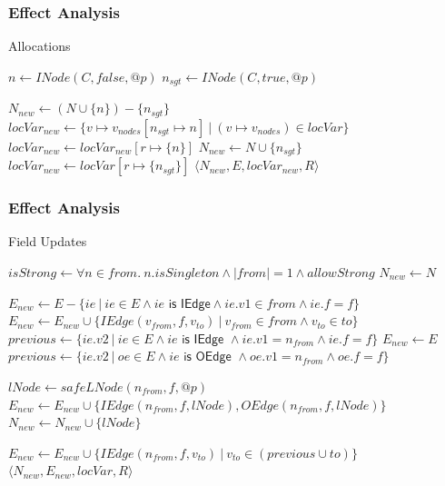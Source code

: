 \documentclass[hyperref={pdfpagelabels=false}]{beamer}
\begin{document}
\begin{frame}[fragile,shrink=20]
    \frametitle{Effect Analysis}
    \begin{algorithm}[H]
    \caption{Allocations}\label{algo:pt:alloc}
    \begin{algorithmic}[1]
        \State $n       \gets INode(C, false, @p)$
        \State $n_{sgt} \gets INode(C, true, @p)$

            \State $N_{new} \gets (N \cup \{ n \}) - \{ n_{sgt} \}$
            \State $locVar_{new} \gets \{ v \mapsto v_{nodes}[n_{sgt} \mapsto n] ~|~ (v \mapsto v_{nodes}) \in locVar \}$
            \State $locVar_{new} \gets locVar_{new}[ r \mapsto \{n\}]$
        \Else
            \State $N_{new} \gets N \cup \{ n_{sgt} \}$
            \State $locVar_{new} \gets locVar[ r \mapsto \{n_{sgt}\}]$
        \EndIf
        \State \Return $\langle N_{new}, E, locVar_{new}, R \rangle$
    \EndFunction
    \end{algorithmic}
    \end{algorithm}
\end{frame}

\begin{frame}[fragile,shrink=40]
    \frametitle{Effect Analysis}

    \begin{algorithm}[H]
    \caption{Field Updates}\label{algo:pt:writes}
    \begin{algorithmic}[1]
        \State $isStrong \gets \forall n \in from.~ n.isSingleton \land |from| = 1 \land allowStrong$
        \State $N_{new} \gets N$

            \State $E_{new} \gets E - \{ ie ~|~ ie \in E \land ie \textsf{ is IEdge} \land ie.v1 \in from \land ie.f = f\} $
            \State $E_{new} \gets E_{new} \cup \{ IEdge(v_{from}, f, v_{to}) ~|~ v_{from} \in from \land v_{to} \in to \}$
        \Else
                \State $previous \gets \{ ie.v2 ~|~ ie \in E \land ie \textsf{ is IEdge } \land ie.v1 = n_{from} \land ie.f = f \}$
                \State $E_{new} \gets E$
                    \State $previous \gets \{ ie.v2 ~|~ oe \in E \land ie \textsf{ is OEdge } \land oe.v1 = n_{from} \land oe.f = f \}$
                \EndIf

                    \State $lNode \gets safeLNode(n_{from}, f, @p)$
                    \State $E_{new} \gets E_{new} \cup \{ IEdge(n_{from}, f, lNode), OEdge(n_{from}, f, lNode) \}$
                    \State $N_{new} \gets N_{new} \cup \{ lNode \}$
                \EndIf


                \State $E_{new} \gets E_{new} \cup \{ IEdge(n_{from}, f, v_{to}) ~|~  v_{to} \in (previous \cup to) \}$
            \EndFor
        \EndIf
        \State \Return $\langle N_{new}, E_{new}, locVar, R \rangle$
    \EndFunction
    \end{algorithmic}
    \end{algorithm}
\end{frame}
\end{document}
